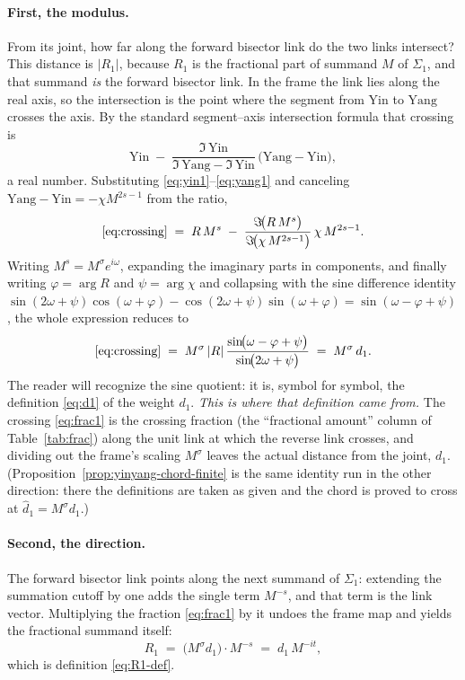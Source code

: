 \documentclass[11pt]{article}
\theoremstyle{definition}
\begin{document}
\paragraph{First, the modulus.} From its joint, how far along the forward
bisector link do the two links intersect? This distance is $|R_{1}|$,
because $R_{1}$ is the fractional part of summand $M$ of
$\Sigma_1$, and that summand \emph{is} the forward bisector link. In the
frame the link lies along the real axis, so the intersection is the point
where the segment from $\mathrm{Yin}$ to $\mathrm{Yang}$ crosses the axis. By
the standard segment--axis intersection formula that crossing is
\begin{equation}\label{eq:crossing}
\mathrm{Yin}
\;-\;
\frac{\Im\,\mathrm{Yin}}
     {\Im\,\mathrm{Yang}-\Im\,\mathrm{Yin}}\,
\bigl(\mathrm{Yang}-\mathrm{Yin}\bigr),
\end{equation}
a real number. Substituting \eqref{eq:yin1}--\eqref{eq:yang1} and canceling
$\mathrm{Yang}-\mathrm{Yin}=-\chi M^{2s-1}$ from the ratio,
\begin{equation}\label{eq:yang3lin}
\eqref{eq:crossing}
\;=\;
R\,M^{s}
\;-\;
\frac{\Im\!\bigl(R\,M^{s}\bigr)}
     {\Im\!\bigl(\chi\,M^{2s-1}\bigr)}\,
\chi\,M^{2s-1}.
\end{equation}
Writing $M^{s}=M^{\sigma}e^{i\omega}$, expanding the imaginary parts in
components, and finally writing $\varphi=\arg R$ and $\psi=\arg\chi$ and
collapsing with the sine difference identity
$\sin(2\omega+\psi)\cos(\omega+\varphi)-\cos(2\omega+\psi)\sin(\omega+\varphi)
=\sin(\omega-\varphi+\psi)$, the whole expression reduces to
\begin{equation}\label{eq:frac1}
\eqref{eq:crossing}
\;=\;
M^{\sigma}\,|R|\,
\frac{\sin\!\bigl(\omega-\varphi+\psi\bigr)}{\sin\!\bigl(2\omega+\psi\bigr)}
\;=\; M^{\sigma}\, d_1 .
\end{equation}
The reader will recognize the sine quotient: it is, symbol for symbol, the
definition \eqref{eq:d1} of the weight $d_1$. \emph{This is where that
definition came from.} The crossing \eqref{eq:frac1} is the crossing
fraction (the ``fractional amount'' column of Table~\ref{tab:frac})
along the unit link at which the reverse link crosses, and dividing out the frame's
scaling $M^{\sigma}$ leaves the actual distance from the joint,
$d_1$. (Proposition~\ref{prop:yinyang-chord-finite} is the same identity
run in the other direction: there the definitions are taken as given and
the chord is proved to cross at $\hat d_1=M^{\sigma}d_1$.)

\paragraph{Second, the direction.} The forward bisector link points along the
next summand of $\Sigma_1$: extending the summation cutoff by one adds the
single term $M^{-s}$, and that term is the link vector. Multiplying the
fraction \eqref{eq:frac1} by it undoes the frame map and yields the
fractional summand itself:
\begin{equation}\label{eq:R1-derived}
R_{1}
\;=\;
\bigl(M^{\sigma} d_1\bigr)\cdot M^{-s}
\;=\;
d_1\,M^{-it},
\end{equation}
which is definition \eqref{eq:R1-def}.
\end{document}

